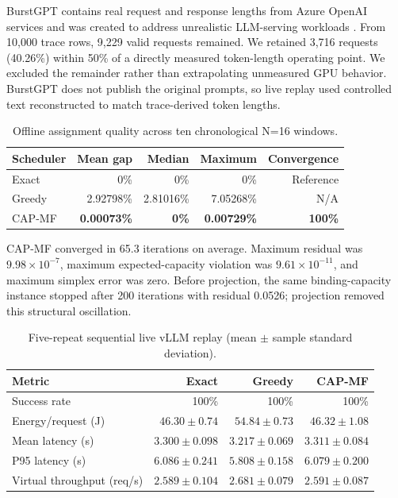 \documentclass[11pt]{article}
\begin{document}
BurstGPT contains real request and response lengths from Azure OpenAI services and was created to address unrealistic LLM-serving workloads \cite{ref:burstgpt}. From 10,000 trace rows, 9,229 valid requests remained. We retained 3,716 requests (40.26\%) within 50\% of a directly measured token-length operating point. We excluded the remainder rather than extrapolating unmeasured GPU behavior. BurstGPT does not publish the original prompts, so live replay used controlled text reconstructed to match trace-derived token lengths.

\begin{table}[ht]
\caption{Offline assignment quality across ten chronological N=16 windows.}
\centering
\small
\begin{tabular}{lrrrr}
\toprule
Scheduler & Mean gap & Median & Maximum & Convergence \\
\midrule
Exact & 0\% & 0\% & 0\% & Reference \\
Greedy & 2.92798\% & 2.81016\% & 7.05268\% & N/A \\
CAP-MF & \textbf{0.00073\%} & \textbf{0\%} & \textbf{0.00729\%} & \textbf{100\%} \\
\bottomrule
\end{tabular}
\label{tab:offline}
\end{table}

CAP-MF converged in 65.3 iterations on average. Maximum residual was $9.98\times10^{-7}$, maximum expected-capacity violation was $9.61\times10^{-11}$, and maximum simplex error was zero. Before projection, the same binding-capacity instance stopped after 200 iterations with residual 0.0526; projection removed this structural oscillation.

\begin{table}[ht]
\caption{Five-repeat sequential live vLLM replay (mean $\pm$ sample standard deviation).}
\centering
\small
\begin{tabular}{lrrr}
\toprule
Metric & Exact & Greedy & CAP-MF \\
\midrule
Success rate & 100\% & 100\% & 100\% \\
Energy/request (J) & $46.30{\pm}0.74$ & $54.84{\pm}0.73$ & $\mathbf{46.32{\pm}1.08}$ \\
Mean latency (s) & $3.300{\pm}0.098$ & $\mathbf{3.217{\pm}0.069}$ & $3.311{\pm}0.084$ \\
P95 latency (s) & $6.086{\pm}0.241$ & $\mathbf{5.808{\pm}0.158}$ & $6.079{\pm}0.200$ \\
Virtual throughput (req/s) & $2.589{\pm}0.104$ & $\mathbf{2.681{\pm}0.079}$ & $2.591{\pm}0.087$ \\
\bottomrule
\end{tabular}
\label{tab:live}
\end{table}
\end{document}

